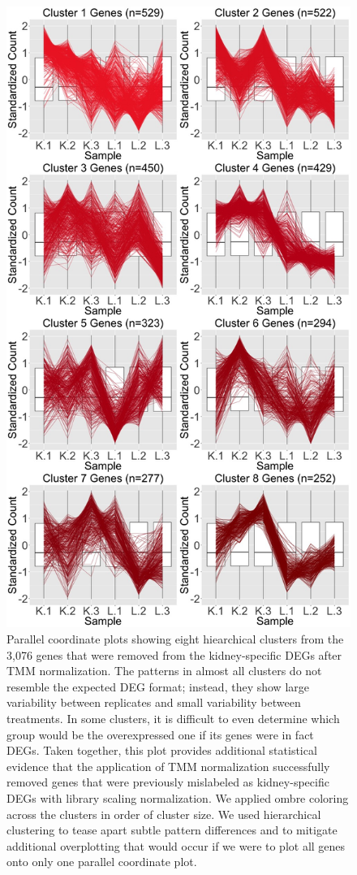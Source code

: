 \documentclass[11pt,a4paper,oldfontcommands,openany]{memoir}
\numberwithin{equation}{section} %
\begin{document}
\null
\begin{figure}[t!]
\begin{framed}
\centerline{\includegraphics[width=0.65\columnwidth]{MakeFigures/lkClustersRemove.jpg}}
\end{framed}
\caption{Parallel coordinate plots showing eight hiearchical clusters from the 3,076 genes that were removed from the kidney-specific DEGs after TMM normalization. The patterns in almost all clusters do not resemble the expected DEG format; instead, they show large variability between replicates and small variability between treatments. In some clusters, it is difficult to even determine which group would be the overexpressed one if its genes were in fact DEGs. Taken together, this plot provides additional statistical evidence that the application of TMM normalization successfully removed genes that were previously mislabeled as kidney-specific DEGs with library scaling normalization. We applied ombre coloring across the clusters in order of cluster size. We used hierarchical clustering to tease apart subtle pattern differences and to mitigate additional overplotting that would occur if we were to plot all genes onto only one parallel coordinate plot.
\label{lkClustersRemove}}
\end{figure}
\end{document}
